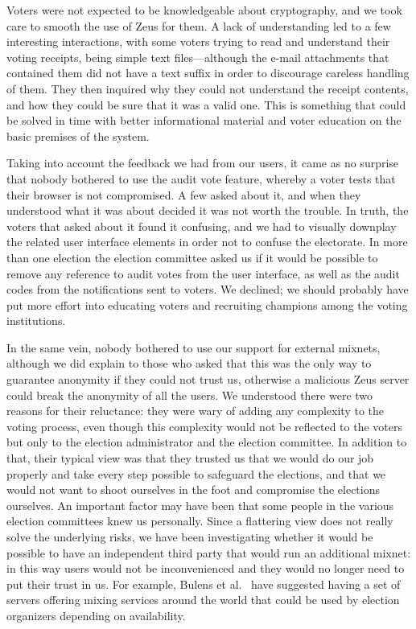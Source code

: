 \documentclass[jets]{usenixjournal}
\begin{document}
Voters were not expected to be knowledgeable about cryptography, and
we took care to smooth the use of Zeus for them. A lack of
understanding led to a few interesting interactions, with some voters
trying to read and understand their voting receipts, being simple text
files---although the e-mail attachments that contained them did not
have a text suffix in order to discourage careless handling of them.
They then inquired why they could not understand the receipt contents,
and how they could be sure that it was a valid one. This is something
that could be solved in time with better informational material and
voter education on the basic premises of the system.

Taking into account the feedback we had from our users,
it came as no surprise that nobody bothered to use the audit vote feature,
whereby a voter tests that their browser is not compromised. A few
asked about it, and when they understood what it was about decided it
was not worth the trouble. In truth, the voters that asked about it
found it confusing, and we had to visually downplay the related user
interface elements in order not to confuse the electorate. In more
than one election the election committee asked us if it would be
possible to remove any reference to audit votes from the user
interface, as well as the audit codes from the notifications sent to
voters. We declined; we should probably have put more effort into
educating voters and recruiting champions among the voting
institutions. 

In the same vein, nobody bothered to use our support for external mixnets,
although we did explain to those who asked that this was the only way
to guarantee anonymity if they could not trust us, otherwise a
malicious Zeus server could break the anonymity of all the users. We
understood there were two reasons for their reluctance: they were wary
of adding any complexity to the voting process, even though this
complexity would not be reflected to the voters but only to the
election administrator and the election committee. In addition to
that, their typical view was that they trusted us that we would do our
job properly and take every step possible to safeguard the elections,
and that we would not want to shoot ourselves in the foot and
compromise the elections ourselves. An important factor may have been
that some people in the various election committees knew us
personally. Since a flattering view does not really solve the
underlying risks, we have been investigating whether it would be
possible to have an independent third party that would run an
additional mixnet: in this way users would not be inconvenienced and
they would no longer need to put their trust in us. For example,
Bulens et al.~\cite{bulens:2011} have suggested having a set of
servers offering mixing services around the world that could be used
by election organizers depending on availability.
\end{document}
